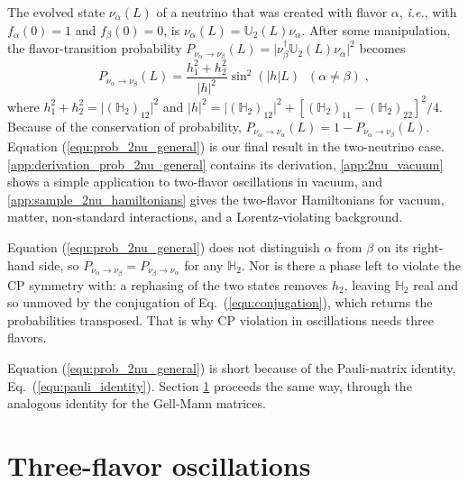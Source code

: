 \documentclass[final,5p,times,twocolumn,sort,compress]{elsarticle}
\newcommand{\ie}{{\it i.e.}}
\newcommand{\eq}{Eq.}
\newcommand{\equ}[1]{\eq~(\ref{equ:#1})}
\begin{document}
The evolved state $\nu_\alpha (L)$ of a neutrino that was created with flavor $\alpha$, \ie, with $f_\alpha(0) = 1$ and $f_\beta(0) = 0$, is $\nu_\alpha\left(L\right) = \mathbb{U}_2(L) \nu_\alpha$.  After some manipulation, the flavor-transition probability $P_{\nu_\alpha \to \nu_\beta}(L) = \lvert \nu_\beta^\dagger \mathbb{U}_2(L) \nu_\alpha \rvert^2$ becomes
\begin{equation}
 \label{equ:prob_2nu_general}
 P_{\nu_\alpha \to \nu_\beta}(L)
 = \frac{h_1^2 + h_2^2}
 {\left\vert h\right\vert^2} \sin^2\left(\left\vert h\right\vert L\right) \;\; (\alpha \neq \beta) \;,
\end{equation}
where $h_1^2 + h_2^2 = \lvert (\mathbb{H}_2)_{12} \rvert^2$ and $\lvert h \rvert^2 = \lvert (\mathbb{H}_2)_{12} \rvert^2 + \left[ (\mathbb{H}_2)_{11} - (\mathbb{H}_2)_{22} \right]^2 / 4$.  Because of the conservation of probability, $P_{\nu_\alpha \rightarrow \nu_\alpha}\left(L\right) = 1 - P_{\nu_\alpha \rightarrow \nu_\beta}\left(L\right)$.  Equation (\ref{equ:prob_2nu_general}) is our final result in the two-neutrino case.  \ref{app:derivation_prob_2nu_general} contains its derivation, \ref{app:2nu_vacuum} shows a simple application to two-flavor oscillations in vacuum, and \ref{app:sample_2nu_hamiltonians} gives the two-flavor Hamiltonians for vacuum, matter, non-standard interactions, and a Lorentz-violating background.

Equation (\ref{equ:prob_2nu_general}) does not distinguish $\alpha$ from $\beta$ on its right-hand side, so $P_{\nu_\alpha \to \nu_\beta} = P_{\nu_\beta \to \nu_\alpha}$ for any $\mathbb{H}_2$.  Nor is there a phase left to violate the CP symmetry with: a rephasing of the two states removes $h_2$, leaving $\mathbb{H}_2$ real and so unmoved by the conjugation of \equ{conjugation}, which returns the probabilities transposed.  That is why CP violation in oscillations needs three flavors.

Equation (\ref{equ:prob_2nu_general}) is short because of the Pauli-matrix identity, \equ{pauli_identity}.  Section \ref{sec:three_flavors} proceeds the same way, through the analogous identity for the Gell-Mann matrices.


\section{Three-flavor oscillations}
\label{sec:three_flavors}
\end{document}
